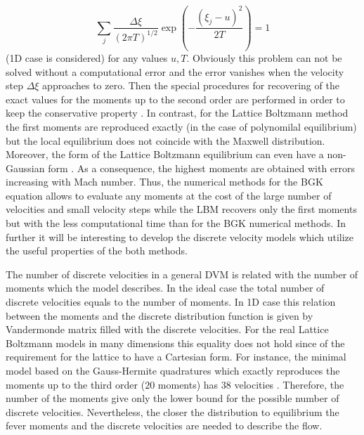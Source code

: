 \documentclass[]{elsarticle} %
\begin{document}
{$$\sum_j  \frac{\Delta \xi}{(2\pi T)^{1/2}}\exp\left(-\frac{(\xi_j-u)^2}{2T}  \right)=1
$$
(1D case is considered) for any values $u,T$. Obviously this problem  can not be solved without a computational error and  the error vanishes when the velocity step $\Delta \xi$ approaches to zero. Then the special procedures for recovering  of the exact values for the moments up to the second  order are performed in order to keep the conservative property \cite{Aristov1980}. In contrast, for the Lattice Boltzmann method  the  first moments are reproduced exactly (in the case  of  polynomilal equilibrium) but  the  local equilibrium does not coincide with the Maxwell distribution. Moreover, the form of the Lattice Boltzmann equilibrium can even have a  non-Gaussian form \cite{Chikatamarla2009}. As a consequence, the highest moments are obtained with errors increasing with Mach number. Thus, the numerical methods  for  the BGK equation allows to evaluate any moments at the cost of the large number of velocities and small velocity steps while the LBM recovers only the first moments but with the less computational time than for the BGK numerical methods. In further  it will be interesting  to develop the discrete velocity models which  utilize  the  useful properties  of the both methods.

The  number  of discrete velocities in a general DVM is related with the number of moments which the model describes. In the  ideal case the total number of discrete velocities equals to the number of  moments.  In 1D case this relation between the moments and the discrete distribution function is  given by Vandermonde matrix filled  with the discrete velocities.
 For the  real Lattice Boltzmann models in many dimensions this  equality does not hold since of the requirement for the  lattice to have a Cartesian form. For instance, the minimal model based on the Gauss-Hermite quadratures which exactly reproduces  the moments up to the third order ($20$ moments) has $38$ velocities \cite{Feuchter2016}. Therefore, the number  of the moments give only the lower bound for the possible number  of discrete velocities. Nevertheless, the closer  the distribution to equilibrium  the fever moments and the discrete velocities are needed to describe  the flow.



}
\end{document}
